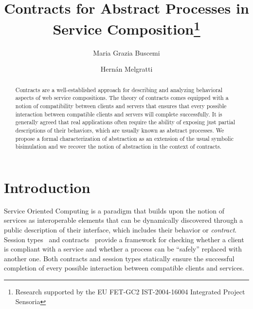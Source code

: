 \documentclass[submission,copyright,creativecommons]{eptcs}
\title{Contracts for Abstract Processes in Service Composition\thanks{
 Research supported
by the EU FET-GC2 IST-2004-16004 Integrated Project {\sc Sensoria}}}
\author{Maria Grazia Buscemi        
\institute{IMT Lucca Institute for Advanced Studies, Italy} 
        \email{m.buscemi@imtlucca.it}
 \and 
 Hern\'an Melgratti
\institute{FCEyN, University of Buenos Aires, Argentina}
\institute{CONICET}
\email{hmelgra@dc.uba.ar}
}
\begin{document}
\maketitle

\begin{abstract}
Contracts are a well-established approach for describing and analyzing behavioral aspects of web service compositions. The theory of contracts comes equipped with a notion of compatibility between clients and servers that ensures that every possible interaction between compatible clients and servers will complete successfully. It is generally agreed that real applications often require the ability of exposing  just  partial descriptions of their behaviors, which are usually known as abstract processes.  We propose a formal characterization of abstraction as an extension of the usual symbolic bisimulation and we recover the notion of abstraction in the context of contracts. 
\end{abstract}

\section{Introduction}
Service Oriented Computing is a paradigm that builds upon the notion of 
services as interoperable elements that can be dynamically discovered through a 
public description
of their interface, which includes their behavior or \emph{contract}.
Session types~\cite{Honda93,DezaniECCOP06,GayHole} and contracts~\cite{LaneveP07,CastagnaGP08,CGP09:TCWS,BZ:TUTCCCC} 
provide a framework for checking whether a client is compliant with a service
and whether a process can be ``safely'' replaced with another one. 
Both contracts and session types statically ensure the successful completion 
of every possible interaction between compatible clients and services. 
\end{document}
